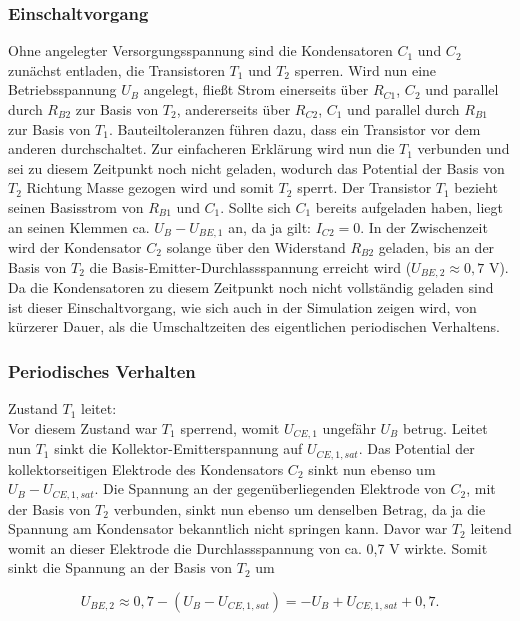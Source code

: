 \subsubsection{Einschaltvorgang}
Ohne angelegter Versorgungsspannung sind die Kondensatoren $C_1$ und $C_2$ zunächst entladen, die Transistoren $T_1$ und $T_2$ sperren. Wird nun eine Betriebsspannung $U_B$ angelegt, fließt Strom einerseits über $R_{C1}$, $C_2$ und parallel durch $R_{B2}$ zur Basis von $T_2$, andererseits über $R_{C2}$, $C_1$ und parallel durch $R_{B1}$ zur Basis von $T_1$. Bauteiltoleranzen führen dazu, dass ein Transistor vor dem anderen durchschaltet. Zur einfacheren Erklärung wird nun die $T_1$ verbunden und sei zu diesem Zeitpunkt noch nicht geladen, wodurch das Potential der Basis von $T_2$ Richtung Masse gezogen wird und somit $T_2$ sperrt. Der Transistor $T_1$ bezieht seinen Basisstrom von $R_{B1}$ und $C_1$. Sollte sich $C_1$ bereits aufgeladen haben, liegt an seinen Klemmen ca. $U_B - U_{BE,1}$ an, da ja gilt: $I_{C2} = 0$. In der Zwischenzeit wird der Kondensator $C_2$ solange über den Widerstand $R_{B2}$ geladen, bis an der Basis von $T_2$ die Basis-Emitter-Durchlassspannung erreicht wird ($U_{BE,2} \approx 0,7$ V). Da die Kondensatoren zu diesem Zeitpunkt noch nicht vollständig geladen sind ist dieser Einschaltvorgang, wie sich auch in der Simulation zeigen wird, von kürzerer Dauer, als die Umschaltzeiten des eigentlichen periodischen Verhaltens.

\subsubsection{Periodisches Verhalten}
Zustand $T_1$ leitet: \\
Vor diesem Zustand war $T_1$ sperrend, womit $U_{CE,1}$ ungefähr $U_B$ betrug. Leitet nun $T_1$ sinkt die Kollektor-Emitterspannung auf $U_{CE,1,sat}$. Das Potential der kollektorseitigen Elektrode des Kondensators $C_2$ sinkt nun ebenso um $U_B - U_{CE,1,sat}$. Die Spannung an der gegenüberliegenden Elektrode von $C_2$, mit der Basis von $T_2$ verbunden, sinkt nun ebenso um denselben Betrag, da ja die Spannung am Kondensator bekanntlich nicht springen kann. Davor war $T_2$ leitend womit an dieser Elektrode die Durchlassspannung von ca. 0,7 V wirkte. Somit sinkt die Spannung an der Basis von $T_2$ um

\begin{equation}
U_{BE,2} \approx 0,7 - (U_B - U_{CE,1,sat}) = -U_B + U_{CE,1,sat} + 0,7 .
\end{equation}

